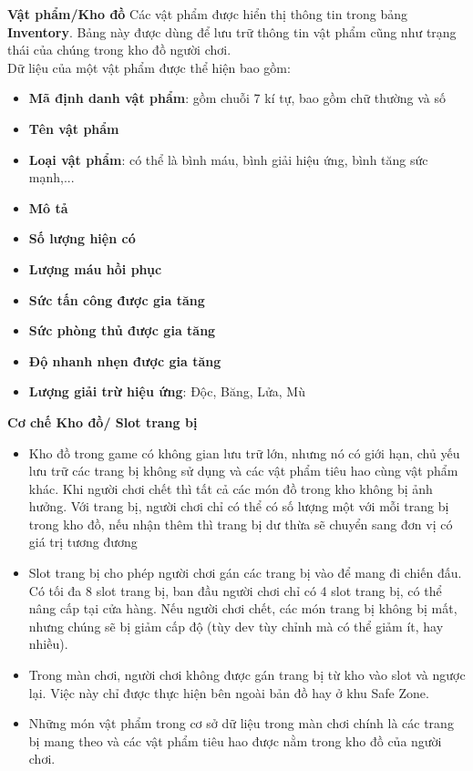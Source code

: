\textbf{Vật phẩm/Kho đồ}
\hspace*{0.5cm} Các vật phẩm được hiển thị thông tin trong bảng \textbf{Inventory}. Bảng này được dùng để lưu trữ thông tin vật phẩm cũng như trạng thái của chúng trong kho đồ người chơi.\\

\hspace*{0.5cm} Dữ liệu của một vật phẩm được thể hiện bao gồm:\\
\begin{itemize}
	\item \textbf{Mã định danh vật phẩm}: gồm chuỗi 7 kí tự, bao gồm chữ thường và số
	\item \textbf{Tên vật phẩm}
	\item \textbf{Loại vật phẩm}: có thể là bình máu, bình giải hiệu ứng, bình tăng sức mạnh,...
	\item \textbf{Mô tả}
	\item \textbf{Số lượng hiện có}
	\item \textbf{Lượng máu hồi phục}
	\item \textbf{Sức tấn công được gia tăng}
	\item \textbf{Sức phòng thủ được gia tăng}
	\item \textbf{Độ nhanh nhẹn được gia tăng}
	\item \textbf{Lượng giải trừ hiệu ứng}: Độc, Băng, Lửa, Mù
\end{itemize}

\textbf{Cơ chế Kho đồ/ Slot trang bị}
\begin{itemize}
	\item Kho đồ trong game có không gian lưu trữ lớn, nhưng nó có giới hạn, chủ yếu lưu trữ các trang bị không sử dụng và các vật phẩm tiêu hao cùng vật phẩm khác. Khi người chơi chết thì tất cả các món đồ trong kho không bị ảnh hưởng. Với trang bị, người chơi chỉ có thể có số lượng một với mỗi trang bị trong kho đồ, nếu nhận thêm thì trang bị dư thừa sẽ chuyển sang đơn vị có giá trị tương đương
	\item Slot trang bị cho phép người chơi gán các trang bị vào để mang đi chiến đấu. Có tối đa 8 slot trang bị, ban đầu người chơi chỉ có 4 slot trang bị, có thể nâng cấp tại cửa hàng. Nếu người chơi chết, các món trang bị không bị mất, nhưng chúng sẽ bị giảm cấp độ (tùy dev tùy chỉnh mà có thể giảm ít, hay nhiều).
	\item Trong màn chơi, người chơi không được gán trang bị từ kho vào slot và ngược lại. Việc này chỉ được thực hiện bên ngoài bản đồ hay ở khu Safe Zone.
	\item Những món vật phẩm trong cơ sở dữ liệu trong màn chơi chính là các trang bị mang theo và các vật phẩm tiêu hao được nằm trong kho đồ của người chơi. 
\end{itemize}






